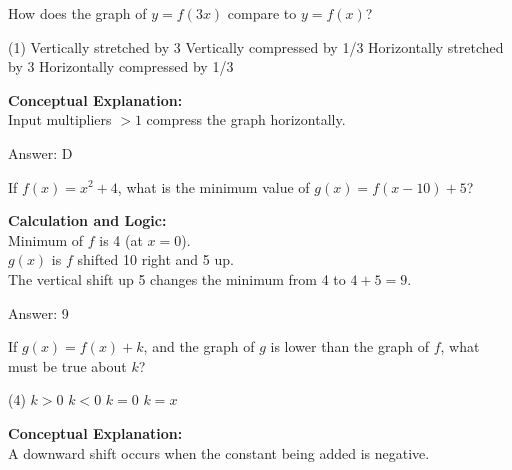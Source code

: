 \documentclass[11pt,paper=a4,answers]{exam}
\begin{document}
\begin{questions}
\question
How does the graph of $y = f(3x)$ compare to $y = f(x)$?
\begin{tasks}(1)
    \task Vertically stretched by 3
    \task Vertically compressed by 1/3
    \task Horizontally stretched by 3
    \task Horizontally compressed by 1/3
\end{tasks}

\begin{solution}
\textbf{Conceptual Explanation:} \\
Input multipliers $> 1$ compress the graph horizontally.

\vspace{25pt}

Answer: \colorbox{yellow!100}{D}
\end{solution}

\vspace{40pt}

\question
If $f(x) = x^2 + 4$, what is the minimum value of $g(x) = f(x-10) + 5$?

\begin{solution}
\textbf{Calculation and Logic:} \\
Minimum of $f$ is 4 (at $x=0$). \\
$g(x)$ is $f$ shifted 10 right and 5 up. \\
The vertical shift up 5 changes the minimum from 4 to $4 + 5 = 9$.

\vspace{25pt}

Answer: \colorbox{yellow!100}{9}
\end{solution}

\vspace{40pt}

\question
If $g(x) = f(x) + k$, and the graph of $g$ is lower than the graph of $f$, what must be true about $k$?
\begin{tasks}(4)
    \task $k > 0$
    \task $k < 0$
    \task $k = 0$
    \task $k = x$
\end{tasks}

\begin{solution}
\textbf{Conceptual Explanation:} \\
A downward shift occurs when the constant being added is negative.


\end{solution}
\end{questions}
\end{document}
